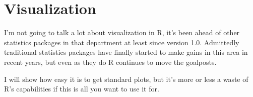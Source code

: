 \documentclass[english,nohyper,titlepage]{tufte-handout}\usepackage[]{graphicx}\usepackage[]{color}
\begin{document}



\part{Visualization}

I'm not going to talk a lot about visualization in R, it's been ahead of other statistics packages in that department at least since version 1.0. Admittedly traditional statistics packages have finally started to make gains in this area in recent years, but even as they do R continues to move the goalposts.

I will show how easy it is to get standard plots, but it's more or less a waste of R's capabilities if this is all you want to use it for.
\end{document}
